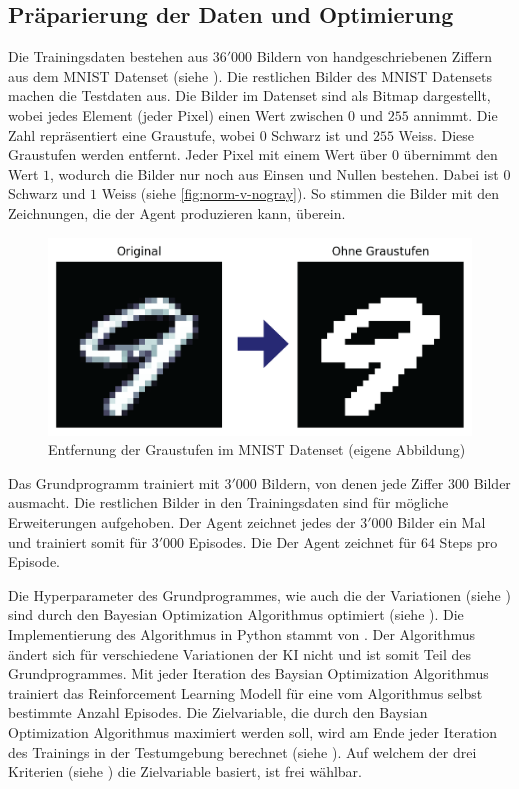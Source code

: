 \subsection{Präparierung der Daten und Optimierung}\label{sub:m_grund_data}
Die Trainingsdaten bestehen aus $36'000$ Bildern von handgeschriebenen Ziffern
aus dem MNIST Datenset (siehe ). Die restlichen Bilder des
MNIST Datensets machen die Testdaten aus. Die Bilder im Datenset sind als Bitmap
dargestellt, wobei jedes Element (jeder Pixel) einen Wert zwischen $0$ und $255$
annimmt. Die Zahl repräsentiert eine Graustufe, wobei $0$ Schwarz ist und $255$
Weiss. Diese Graustufen werden entfernt. Jeder Pixel mit einem Wert über $0$
übernimmt den Wert $1$, wodurch die Bilder nur noch aus Einsen und Nullen
bestehen. Dabei ist $0$ Schwarz und $1$ Weiss (siehe \autoref{fig:norm-v-nogray}).
So stimmen die Bilder mit den Zeichnungen, die der Agent produzieren kann,
überein.

\begin{figure}[!ht]
  \centering
  \includegraphics[width=\textwidth]{images/methode/norm-v-nogray.png}
  \caption{Entfernung der Graustufen im MNIST Datenset (eigene Abbildung)}\label{fig:norm-v-nogray}
\end{figure}


Das Grundprogramm trainiert mit $3'000$ Bildern, von denen jede Ziffer $300$
Bilder ausmacht. Die restlichen Bilder in den Trainingsdaten sind für mögliche  
Erweiterungen aufgehoben. Der Agent zeichnet jedes der $3'000$ Bilder ein Mal und
trainiert somit für $3'000$ Episodes. Die Der Agent zeichnet für $64$ Steps pro
Episode.

Die Hyperparameter des Grundprogrammes, wie auch die der Variationen (siehe
) sind durch den Bayesian Optimization Algorithmus
optimiert (siehe ). Die Implementierung des
Algorithmus in Python stammt von \cite{fernando_nogueira_bayesian_2014}. Der
Algorithmus ändert sich für verschiedene Variationen der KI nicht und ist somit
Teil des Grundprogrammes. Mit jeder Iteration des Baysian Optimization
Algorithmus trainiert das Reinforcement Learning Modell für eine vom Algorithmus
selbst bestimmte Anzahl Episodes. Die Zielvariable, die durch den Baysian
Optimization Algorithmus maximiert werden soll, wird am Ende jeder Iteration des
Trainings in der Testumgebung berechnet (siehe ).
Auf welchem der drei Kriterien (siehe ) die Zielvariable
basiert, ist frei wählbar.



